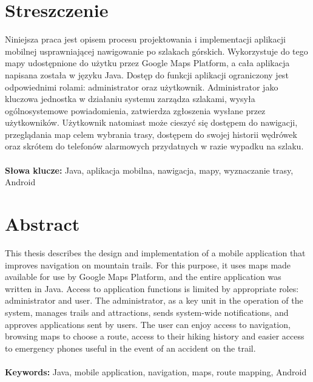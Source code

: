 \section{Streszczenie}
Niniejsza praca jest opisem procesu projektowania i implementacji aplikacji mobilnej usprawniającej nawigowanie po szlakach górskich. Wykorzystuje do tego mapy udostępnione do użytku przez Google Maps Platform, a cała aplikacja napisana została w języku Java. Dostęp do funkcji aplikacji ograniczony jest odpowiednimi rolami: administrator oraz użytkownik. Administrator jako kluczowa jednostka w działaniu systemu zarządza szlakami, wysyła ogólnosystemowe powiadomienia, zatwierdza zgłoszenia wysłane przez użytkowników. Użytkownik natomiast może cieszyć się dostępem do nawigacji, przeglądania map celem wybrania trasy, dostępem do swojej historii wędrówek oraz skrótem do telefonów alarmowych przydatnych w razie wypadku na szlaku. \\
\\
\textbf{Słowa klucze:} Java, aplikacja mobilna, nawigacja, mapy, wyznaczanie trasy, Android

\section*{Abstract}
This thesis describes the design and implementation of a mobile application that improves navigation on mountain trails. For this purpose, it uses maps made available for use by Google Maps Platform, and the entire application was written in Java. Access to application functions is limited by appropriate roles: administrator and user. The administrator, as a key unit in the operation of the system, manages trails and attractions, sends system-wide notifications, and approves applications sent by users. The user can enjoy access to navigation, browsing maps to choose a route, access to their hiking history and easier access to emergency phones useful in the event of an accident on the trail. \\
\\
\textbf{Keywords:} Java, mobile application, navigation, maps, route mapping, Android